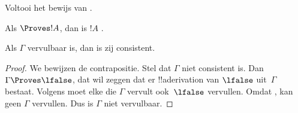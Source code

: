 \documentclass[../../../include/open-logic-section]{subfiles}
\begin{document}
\begin{prob}
  Voltooi het bewijs van .
\end{prob}
\tagendprob

\begin{cor}
Als $\Proves !A$, dan is $!A$ .
\end{cor}

\begin{cor}
Als $\Gamma$ vervulbaar is, dan is zij consistent.
\end{cor}

\begin{proof}
We bewijzen de contrapositie. Stel dat $\Gamma$ niet consistent is.
Dan $\Gamma \Proves \lfalse$, dat wil zeggen dat er
!!a{derivation} van $\lfalse$ uit~$\Gamma$ bestaat. Volgens
 moet elke
die $\Gamma$ vervult ook~$\lfalse$ vervullen. Omdat
, kan geen
 $\Gamma$ vervullen. Dus is
$\Gamma$ niet vervulbaar.
\end{proof}
\end{document}
